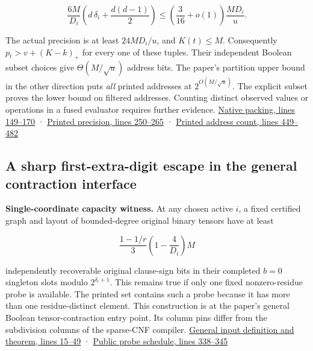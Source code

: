 \documentclass[11pt,a4paper]{article}
\begin{document}
\[
 \frac{6M}{D_i}\left(d\,\delta_i+\frac{d(d-1)}2\right)
 \le \left(\frac{3}{16}+o(1)\right)\frac{MD_i}{u}.
\]

The actual precision is at least \(24 MD_i/u\), and \(K(t)\le M\).
Consequently \(p_t>v+(K-k)_+\) for every one of these tuples. Their
independent Boolean subset choices give \(\Theta(M/\sqrt u)\) address
bits. The paper's partition upper bound in the other direction puts
\emph{all} printed addresses at \(2^{O(M/\sqrt u)}\). The explicit
subset proves the lower bound on filtered addresses. Counting distinct
observed values or operations in a fused evaluator requires further
evidence.
\href{https://github.com/openai/math/blob/main/preprints/The-Exponential-Time-Hypothesis-is-False-October-25-2026/build/quantitative-contraction.tex\#L149}{Native
packing, lines 149--170} ·
\href{https://github.com/openai/math/blob/main/preprints/The-Exponential-Time-Hypothesis-is-False-October-25-2026/build/quantitative-contraction.tex\#L250}{Printed
precision, lines 250--265} ·
\href{https://github.com/openai/math/blob/main/preprints/The-Exponential-Time-Hypothesis-is-False-October-25-2026/build/quantitative-contraction.tex\#L449}{Printed
address count, lines 449--482}

\subsection{A sharp first-extra-digit escape in the general contraction
interface}\label{v9-a-sharp-first-extra-digit-escape-in-the-general-contraction-interface}

\textbf{Single-coordinate capacity witness.} At any chosen active \(i\),
a fixed certified graph and layout of bounded-degree original binary
tensors have at least

\[
       \frac{1-1/r}{3}\left(1-\frac{4}{D_i}\right)M
       \tag{P10}
\]

independently recoverable original clause-sign bits in their completed
\(b=0\) singleton slots modulo \(2^{\delta_i+1}\). This remains true if
only one fixed nonzero-residue probe is available. The printed set
contains such a probe because it has more than one residue-distinct
element. This construction is at the paper's general Boolean
tensor-contraction entry point. Its column pins differ from the
subdivision columns of the sparse-CNF compiler.
\href{https://github.com/openai/math/blob/main/preprints/The-Exponential-Time-Hypothesis-is-False-October-25-2026/build/quantitative-reduction.tex\#L15}{General
input definition and theorem, lines 15--49} ·
\href{https://github.com/openai/math/blob/main/preprints/The-Exponential-Time-Hypothesis-is-False-October-25-2026/build/quantitative-contraction.tex\#L338}{Public
probe schedule, lines 338--345}
\end{document}
